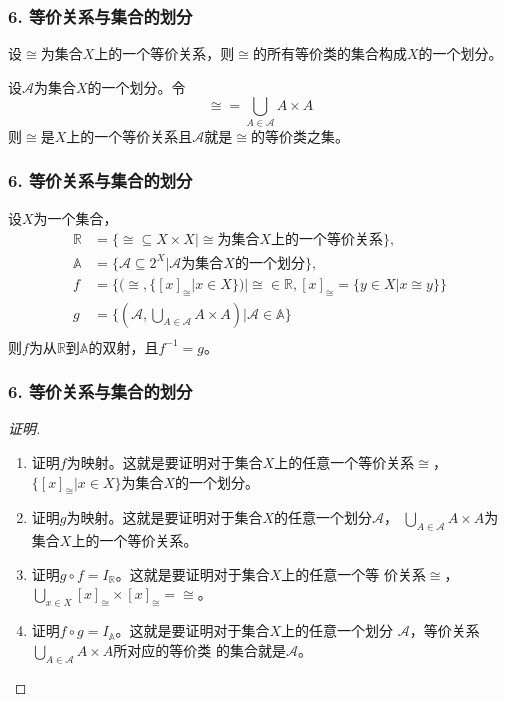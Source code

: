 \documentclass{beamer}
\begin{document}
\begin{CJK*}{UTF8}{gbsn}
\begin{frame}
  \frametitle{6. 等价关系与集合的划分}
  \begin{Thm}
    设$\cong$为集合$X$上的一个等价关系，则$\cong$的所有等价类的集合构成$X$的一个划分。
  \end{Thm}
  \pause
  \begin{Thm}
    设$\mathscr{A}$为集合$X$的一个划分。令
    \begin{equation*}
      \cong = \bigcup_{A\in \mathscr{A}}A\times A
    \end{equation*}
    则$\cong$是$X$上的一个等价关系且$\mathscr{A}$就是$\cong$的等价类之集。
  \end{Thm}
\end{frame}
\begin{frame}
  \frametitle{6. 等价关系与集合的划分}
  \begin{Thm}
    设$X$为一个集合，
    \begin{align*}
    \mathbb{R} &= \{\cong \subseteq X \times X | \cong\text{为集合}X\text{上的一个等价关系}\},\\
      \mathbb{A} &= \{\mathscr{A} \subseteq 2^X| \mathscr{A}\text{为集合}X\text{的一个划分}\},\\
      f &= \{(\cong, \{[x]_{\cong} | x \in X\})|\cong \in \mathbb{R}, [x]_{\cong}=\{y\in X | x \cong y\}\}\\
      g&=\{(\mathscr{A}, \bigcup_{A \in \mathscr{A}}A\times A)|\mathscr{A} \in \mathbb{A}\}\\
    \end{align*}
    则$f$为从$\mathbb{R}$到$\mathbb{A}$的双射，且$f^{-1}=g$。
  \end{Thm}
  
\end{frame}

\begin{frame}
  \frametitle{6. 等价关系与集合的划分}
  \begin{proof}[证明]
    \begin{enumerate}
    \item 证明$f$为映射。这就是要证明对于集合$X$上的任意一个等价关系$\cong$，　
      $\{[x]_{\cong}|x\in X\}$为集合$X$的一个划分。
    \item 证明$g$为映射。这就是要证明对于集合$X$的任意一个划分$\mathscr{A}$，
      $\bigcup_{A\in \mathscr{A}}A\times A$为集合$X$上的一个等价关系。
    \item 证明$g\circ f = I_{\mathbb{R}}$。这就是要证明对于集合$X$上的任意一个等
      价关系$\cong$，$\bigcup_{x\in X}[x]_{\cong}\times [x]_{\cong} = \cong$。
    \item 证明$f\circ g = I_{\mathbb{A}}$。这就是要证明对于集合$X$上的任意一个划分
      $\mathscr{A}$，等价关系$\bigcup_{A \in \mathscr{A}}A\times A$所对应的等价类
      的集合就是$\mathscr{A}$。
    \end{enumerate}
  \end{proof}
  

\end{frame}
\end{CJK*}
\end{document}
